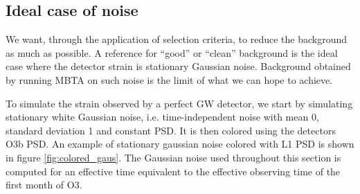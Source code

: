 


\subsection{Ideal case of noise}
\label{sec:gaussian_noise}
We want, through the application of selection criteria, to reduce the background as much as possible.
A reference for ``good'' or ``clean'' background is the ideal case where the detector strain is stationary Gaussian noise.
Background obtained by running MBTA on such noise is the limit of what we can hope to achieve.

To simulate the strain observed by a  perfect GW detector, we start by simulating stationary white Gaussian noise, i.e. time-independent noise with mean 0, standard deviation 1 and constant PSD.
It is then colored using the detectors O3b PSD.
An example of stationary gaussian noise colored with L1 PSD is shown in figure \ref{fig:colored_gaus}.
The Gaussian noise used throughout this section is computed for an effective time equivalent to the effective observing time of the first month of O3.

